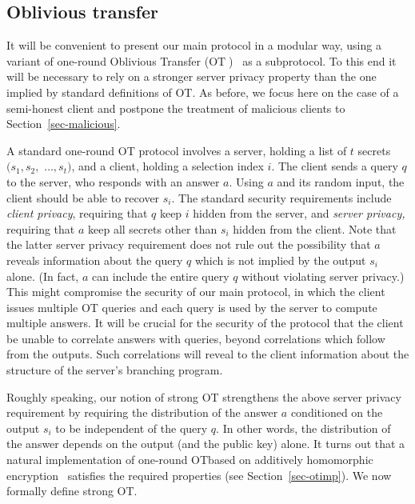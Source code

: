 \documentclass{article}
\newcommand{\ot}{\mbox{OT}\;}
\newcommand{\otns}{\mbox{OT}}
\begin{document}
\subsection{Oblivious transfer} \label{sec-ot} It will be
convenient to present our main protocol in a modular way, using a
variant of one-round Oblivious Transfer ($\ot$)~\cite{Ra,EGL} as a
subprotocol. To this end it will be necessary to rely on a stronger
server privacy property than the one implied by standard definitions
of \otns. As before, we focus here on the case of a semi-honest client
and postpone the treatment of malicious clients to
Section~\ref{sec-malicious}.

A standard one-round OT protocol involves a server, holding a list of
$t$ secrets $(s_1,s_2,$ $\ldots,s_t)$, and a client, holding a
selection index $i$. The client sends a query $q$ to the server, who
responds with an answer $a$. Using $a$ and its random input, the
client should be able to recover $s_i$. The standard security
requirements include {\em client privacy}, requiring that $q$ keep
$i$ hidden from the server, and {\em server privacy,} requiring that
$a$ keep all secrets other than $s_i$ hidden from the client. Note
that the latter server privacy requirement does not rule out the
possibility that $a$ reveals information about the query $q$ which is
not implied by the output $s_i$ alone. (In fact, $a$ can include the
entire query $q$ without violating server privacy.) This might
compromise the security of our main protocol, in which the client
issues multiple OT queries and each query is used by the server to
compute multiple answers. It will be crucial for the security of the
protocol that the client be unable to correlate answers with queries,
beyond correlations which follow from the outputs. Such correlations
will reveal to the client information about the structure of the
server's branching program.

Roughly speaking, our notion of strong OT strengthens the above
server privacy requirement by requiring the distribution of the
answer $a$  conditioned on the output $s_i$ to be independent of the
query $q$. In other words, the distribution of the answer depends on
the output (and the public key) alone. It turns out that a natural
implementation of one-round \otns based on additively homomorphic
encryption~\cite{KO97,Ste98} satisfies the required properties (see
Section~\ref{sec-otimp}). We now formally define strong \otns.
\end{document}
